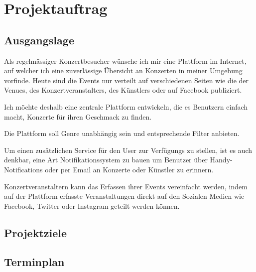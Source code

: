\chapter{Projektauftrag}

\label{AppendixProjektauftrag}

\section{Ausgangslage}\label{ausgangslage}

Als regelmässiger Konzertbesucher wünsche ich mir eine Plattform im
Internet, auf welcher ich eine zuverlässige Übersicht an Konzerten in
meiner Umgebung vorfinde. Heute sind die Events nur verteilt auf
verschiedenen Seiten wie die der Venues, des Konzertveranstalters, des
Künstlers oder auf Facebook publiziert.

Ich möchte deshalb eine zentrale Plattform entwickeln, die es Benutzern
einfach macht, Konzerte für ihren Geschmack zu finden.

Die Plattform soll Genre unabhängig sein und entsprechende Filter
anbieten.

Um einen zusätzlichen Service für den User zur Verfügungs zu stellen,
ist es auch denkbar, eine Art Notifikationssystem zu bauen um Benutzer
über Handy-Notifications oder per Email an Konzerte oder Künstler zu
erinnern.

Konzertveranstaltern kann das Erfassen ihrer Events vereinfacht werden,
indem auf der Plattform erfasste Veranstaltungen direkt auf den Sozialen
Medien wie Facebook, Twitter oder Instagram geteilt werden können.

\clearpage
\section{Projektziele}\label{projektziele}




\clearpage
\section{Terminplan}\label{terminplan}

